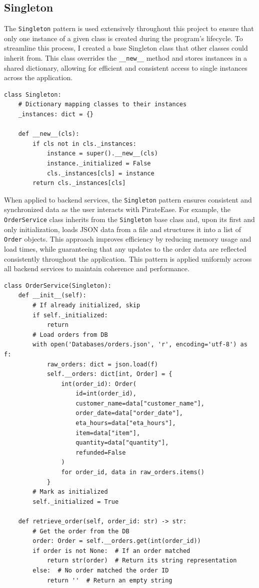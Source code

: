 \documentclass[11pt]{article}
\begin{document}
\subsection{Singleton} 
The \texttt{Singleton} pattern is used extensively throughout this project to ensure that only one instance of a given class is created during the program's lifecycle. To streamline this process, I created a base Singleton class that other classes could inherit from. This class overrides the \texttt{\_\_new\_\_} method and stores instances in a shared dictionary, allowing for efficient and consistent access to single instances across the application.	
\begin{lstlisting}
class Singleton:
    # Dictionary mapping classes to their instances
    _instances: dict = {}

    def __new__(cls):
        if cls not in cls._instances:
            instance = super().__new__(cls)
            instance._initialized = False
            cls._instances[cls] = instance
        return cls._instances[cls]
\end{lstlisting}
%
\noindent
When applied to backend services, the \texttt{Singleton} pattern ensures consistent and synchronized data as the user interacts with PirateEase. For example, the \texttt{OrderService} class inherits from the \texttt{Singleton} base class and, upon its first and only initialization, loads JSON data from a file and structures it into a list of \texttt{Order} objects. This approach improves efficiency by reducing memory usage and load times, while guaranteeing that any updates to the order data are reflected consistently throughout the application. This pattern is applied uniformly across all backend services to maintain coherence and performance.
\begin{lstlisting}
class OrderService(Singleton):
    def __init__(self):
        # If already initialized, skip
        if self._initialized:
            return
        # Load orders from DB
        with open('Databases/orders.json', 'r', encoding='utf-8') as f:
            raw_orders: dict = json.load(f)
            self.__orders: dict[int, Order] = {
                int(order_id): Order(
                    id=int(order_id),
                    customer_name=data["customer_name"],
                    order_date=data["order_date"],
                    eta_hours=data["eta_hours"],
                    item=data["item"],
                    quantity=data["quantity"],
                    refunded=False
                )
                for order_id, data in raw_orders.items()
            }
        # Mark as initialized
        self._initialized = True

    def retrieve_order(self, order_id: str) -> str:
        # Get the order from the DB
        order: Order = self.__orders.get(int(order_id))
        if order is not None:  # If an order matched
            return str(order)  # Return its string representation
        else:  # No order matched the order ID
            return ''  # Return an empty string
\end{lstlisting}
\end{document}
